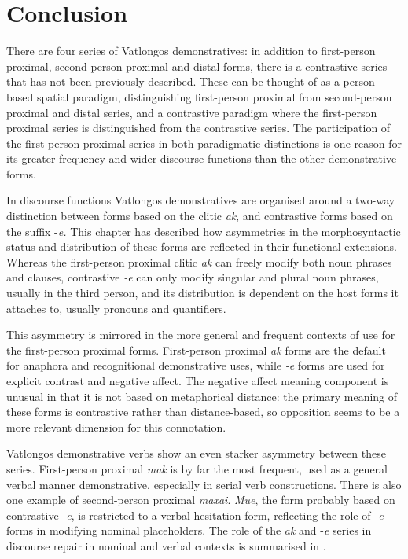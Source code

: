 \documentclass[output=paper,colorlinks,citecolor=brown]{langscibook}
\begin{document}
\section{Conclusion}
\label{sec:ridge:6}

There are four series of Vatlongos demonstratives: in addition to first-person proximal, second-person proximal and distal forms, there is a contrastive series that has not been previously described. These can be thought of as a person-based spatial paradigm, distinguishing first-person proximal from second-person proximal and distal series, and a contrastive paradigm where the first-person proximal series is distinguished from the contrastive series. The participation of the first-person proximal series in both paradigmatic distinctions is one reason for its greater frequency and wider discourse functions than the other demonstrative forms.

In discourse functions Vatlongos demonstratives are organised around a two-way distinction between forms based on the clitic \textit{ak}, and contrastive forms based on the suffix -\textit{e.} This chapter has described how asymmetries in the morphosyntactic status and distribution of these forms are reflected in their functional extensions. Whereas the first-person proximal clitic \textit{ak} can freely modify both noun phrases and clauses, contrastive \textit{-e} can only modify singular and plural noun phrases, usually in the third person, and its distribution is dependent on the host forms it attaches to, usually pronouns and quantifiers.

This asymmetry is mirrored in the more general and frequent contexts of use for the first-person proximal forms. First-person proximal \textit{ak} forms are the default for anaphora and recognitional demonstrative uses, while \textit{-e} forms are used for explicit contrast and negative affect. The negative affect meaning component is unusual in that it is not based on metaphorical distance: the primary meaning of these forms is contrastive rather than distance-based, so opposition seems to be a more relevant dimension for this connotation.

Vatlongos demonstrative verbs show an even starker asymmetry between these series. First-person proximal \textit{mak} is by far the most frequent, used as a general verbal manner demonstrative, especially in serial verb constructions. There is also one example of second-person proximal \textit{maxai}. \textit{Mue}, the form probably based on contrastive \textit{-e}, is restricted to a verbal hesitation form, reflecting the role of \textit{-e} forms in modifying nominal placeholders. The role of the \textit{ak} and -\textit{e} series in discourse repair in nominal and verbal contexts is summarised in .
\end{document}
